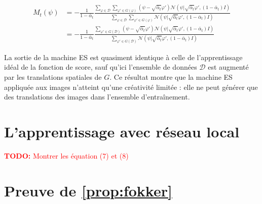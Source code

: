 \documentclass[a4paper,10pt]{article}
\theoremstyle{definition} %
\theoremstyle{definition} %
\theoremstyle{definition} %
\theoremstyle{definition} %
\newcommand{\todo}[1]{\textcolor{red}{\textbf{TODO:} #1}}
\begin{document}
\begin{align*}
        M_t(\psi) &= -\frac{1}{1-\bar \alpha_t} \frac{\sum_{\varphi \in \mathcal{D}} \sum_{\varphi' \in G(\varphi)} (\psi - \sqrt{\bar \alpha_t} \varphi') \mathcal{N}(\psi | \sqrt{\bar \alpha_t} \varphi', (1-\bar \alpha_t) I) }{\sum_{\varphi \in \mathcal{D}} \sum_{\varphi'\in G(\varphi)} \mathcal{N}(\psi | \sqrt{\bar \alpha_t} \varphi', (1-\bar \alpha_t) I)}\\
        &= -\frac{1}{1-\bar \alpha_t} \frac{ \sum_{\varphi' \in G(\mathcal{D})} (\psi - \sqrt{\bar \alpha_t} \varphi') \mathcal{N}(\psi | \sqrt{\bar \alpha_t} \varphi', (1-\bar \alpha_t) I) }{ \sum_{\varphi'\in G(\mathcal{D})} \mathcal{N}(\psi | \sqrt{\bar \alpha_t} \varphi', (1-\bar \alpha_t) I)}
\end{align*}

La sortie de la machine ES est quasiment identique à celle de l'apprentissage idéal de la fonction de score, sauf qu'ici l'ensemble de données $\mathcal{D}$ est augmenté par les translations spatiales de $G$. Ce résultat montre que la machine ES appliquée aux images n'atteint qu'une créativité limitée : elle ne peut générer que des translations des images dans l'ensemble d'entraînement.


\section{L'apprentissage avec réseau local}

\todo{Montrer les équation (7) et (8)}



\appendix

\section{Preuve de \cref{prop:fokker} \label{sec:proof_focker}}
\end{document}
